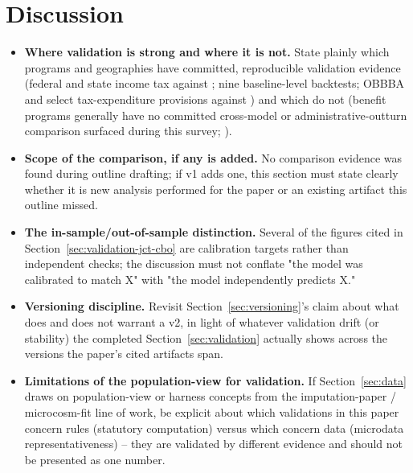 \section{Discussion}
\label{sec:discussion}


\begin{itemize}
\item \textbf{Where validation is strong and where it is not.} State
plainly which programs and geographies have committed, reproducible
validation evidence (federal and state income tax against \taxsim{}; nine
\soi{} baseline-level backtests; OBBBA and select tax-expenditure provisions
against \jct{}) and which do not (benefit programs generally have no
committed cross-model or administrative-outturn comparison surfaced during
this survey; ).
\item \textbf{Scope of the \tpc{} comparison, if any is added.} No \tpc{}
comparison evidence was found during outline drafting; if v1 adds one, this
section must state clearly whether it is new analysis performed for the
paper or an existing artifact this outline missed.
\item \textbf{The in-sample/out-of-sample distinction.} Several of the
\jct{} figures cited in Section~\ref{sec:validation-jct-cbo} are calibration
targets rather than independent checks; the discussion must not conflate
"the model was calibrated to match X" with "the model independently
predicts X."
\item \textbf{Versioning discipline.} Revisit Section~\ref{sec:versioning}'s
claim about what does and does not warrant a v2, in light of whatever
validation drift (or stability) the completed Section~\ref{sec:validation}
actually shows across the \policyengineus{} versions the paper's cited
artifacts span.
\item \textbf{Limitations of the population-view for validation.} If
Section~\ref{sec:data} draws on population-view or harness concepts from
the imputation-paper / microcosm-fit line of work, be explicit about which
validations in this paper concern rules (statutory computation) versus
which concern data (microdata representativeness) -- they are validated by
different evidence and should not be presented as one number.
\end{itemize}
